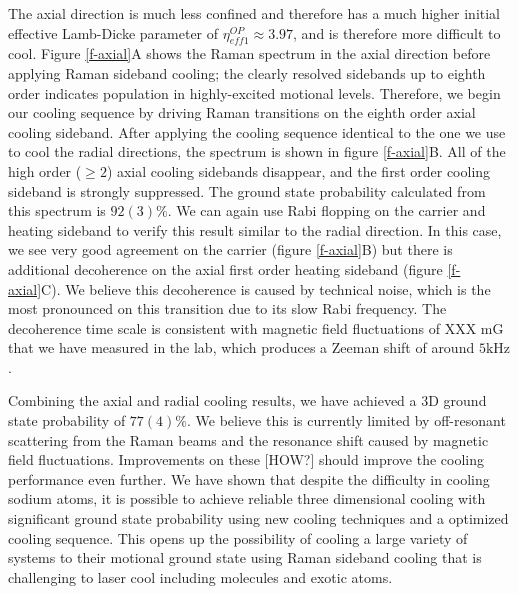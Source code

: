 \documentclass[aps,prl,twocolumn,groupedaddress]{revtex4-1}
\begin{document}
The axial direction is much less confined and therefore has a much higher initial effective
Lamb-Dicke parameter of $\eta^{OP}_{eff1}\approx 3.97$, and is therefore more difficult to cool.
Figure \ref{f-axial}A shows the Raman spectrum in the axial direction
before applying Raman sideband cooling; the clearly resolved sidebands
up to eighth order indicates population in highly-excited motional levels.
Therefore, we begin our cooling sequence by driving Raman transitions on the eighth order axial
cooling sideband. After applying the cooling sequence identical to the one we use to cool
the radial directions, the spectrum is shown in figure \ref{f-axial}B.
All of the high order ($\geqslant2$) axial cooling sidebands disappear, and the first order
cooling sideband is strongly suppressed.
The ground state probability calculated from this spectrum is $92(3)\%$.
We can again use Rabi flopping on the carrier and heating sideband to verify this result
similar to the radial direction. In this case, we see very good agreement on the carrier
(figure \ref{f-axial}B) but there is additional decoherence on the axial first order
heating sideband (figure \ref{f-axial}C).
We believe this decoherence is caused by technical noise, which is the most pronounced
on this transition due to its slow Rabi frequency.
The decoherence time scale is consistent with magnetic field fluctuations of XXX mG that we have measured in the lab, which produces
a Zeeman shift of around $5\text{kHz}$.


Combining the axial and radial cooling results,
we have achieved a 3D ground state probability of $77(4)\%$.
We believe this is currently limited by off-resonant scattering from the Raman beams
and the resonance shift caused by magnetic field fluctuations.
Improvements on these [HOW?] should improve the cooling performance even further.
We have shown that despite the difficulty in cooling sodium atoms,
it is possible to achieve reliable three dimensional cooling with significant ground state
probability using new cooling techniques and a optimized cooling sequence.
This opens up the possibility of cooling a large variety of systems to their motional ground
state using Raman sideband cooling that is challenging to laser cool
including molecules and exotic atoms.



\end{document}
